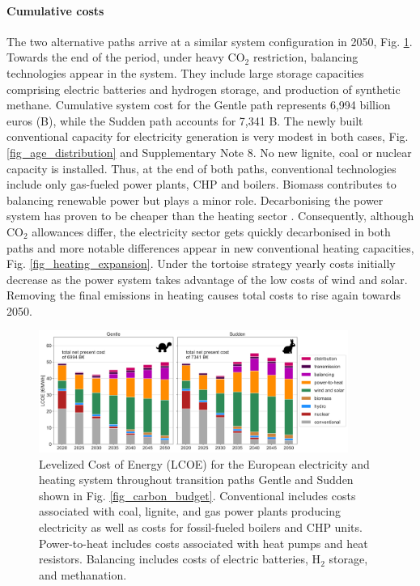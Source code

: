 \documentclass[5p]{elsarticle} %
\begin{document}
\paragraph{\textbf{Cumulative costs}} The two alternative paths arrive at a similar system configuration in 2050, Fig. \ref{fig_system_cost}. Towards the end of the period, under heavy CO$_2$ restriction, balancing technologies appear in the system. They include large storage capacities comprising electric batteries and hydrogen storage, and production of synthetic methane.  Cumulative system cost for the Gentle path represents 6,994 billion euros (B\EUR), while the Sudden path accounts for 7,341 B\EUR. The newly built conventional capacity for electricity generation is very modest in both cases, Fig. \ref{fig_age_distribution} and Supplementary Note 8. No new lignite, coal or nuclear capacity is installed. Thus, at the end of both paths, conventional technologies include only gas-fueled power plants, CHP and boilers. Biomass contributes to balancing renewable power but plays a minor role. Decarbonising the power system has proven to be cheaper than the heating sector \cite{Zhu_2019}. Consequently, although CO$_2$ allowances differ, the electricity sector gets quickly decarbonised in both paths and more notable differences appear in new conventional heating capacities, Fig. \ref{fig_heating_expansion}. Under the tortoise strategy yearly costs initially decrease as the power system takes advantage of the low costs of wind and solar. Removing the final emissions in heating causes total costs to rise again towards 2050.

\begin{figure}[!h]
\centering
\includegraphics[width=0.9\textwidth]{../figures/LCOE_Base.png}
\caption{Levelized Cost of Energy (LCOE) for the European electricity and heating system throughout transition paths Gentle and Sudden shown in Fig. \ref{fig_carbon_budget}. Conventional includes costs associated with coal, lignite, and gas power plants producing electricity as well as costs for fossil-fueled boilers and CHP units. Power-to-heat includes costs associated with heat pumps and heat resistors. Balancing includes costs of electric batteries, H$_2$ storage, and methanation.} \label{fig_system_cost} 
\end{figure}
\end{document}
